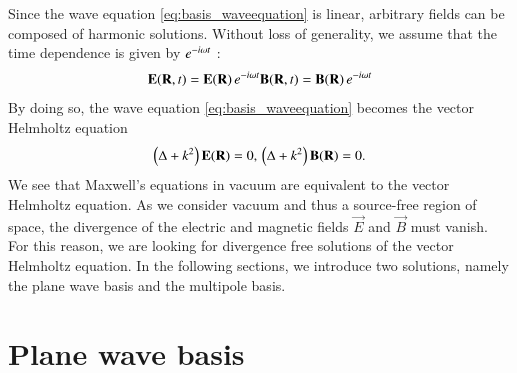 Since the
wave equation \eqref{eq:basis_waveequation} is linear, arbitrary fields can be
composed of harmonic solutions. Without loss of generality, we assume that
the time dependence is given by $e^{-i\omega t}$
\cite{bohrenhuffman,jackson, stratton}:
\begin{equation}
{\mathbf{E}}({\mathbf{R}},t) = {\mathbf{E}}({\mathbf{R}}) \, e^{-i\omega t} \\
{\mathbf{B}}({\mathbf{R}},t) = {\mathbf{B}}({\mathbf{R}}) \, e^{-i\omega t}
\end{equation}
By doing so, the wave equation \eqref{eq:basis_waveequation} becomes the vector Helmholtz equation
\begin{equation}
\label{eq:basis_helmholtz}
\left(\Delta + k^2\right) \vec E(\vec R) = 0, \\ \left(\Delta + k^2\right) \vec B(\vec R) = 0.
\end{equation}
We see that Maxwell's equations in vacuum are equivalent to the vector
Helmholtz equation. As we consider vacuum and thus a source-free region of
space, the divergence of the electric and magnetic fields $\vec E$ and $\vec B$
must vanish. For this reason, we are looking for divergence free solutions of
the vector Helmholtz equation. In the following sections, we introduce two
solutions, namely the plane wave basis and the multipole basis.


\section{Plane wave basis}


